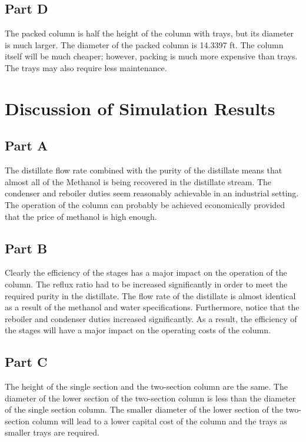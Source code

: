 \documentclass[12pt]{article}
\begin{document}
\subsection{Part D}
The packed column is half the height of the column with trays, but its diameter is much larger. The diameter of the packed column is 14.3397 ft. The column itself will be much cheaper; however, packing is much more expensive than trays. The trays may also require less maintenance.

\section{Discussion of Simulation Results}

\subsection{Part A}
The distillate flow rate combined with the purity of the distillate means that almost all of the Methanol is being recovered in the distillate stream. The condenser and reboiler duties seem reasonably achievable in an industrial setting. The operation of the column can probably be achieved economically provided that the price of methanol is high enough.

\subsection{Part B}
Clearly the efficiency of the stages has a major impact on the operation of the column. The reflux ratio had to be increased significantly in order to meet the required purity in the distillate. The flow rate of the distillate is almost identical as a result of the methanol and water specifications. Furthermore, notice that the reboiler and condenser duties increased significantly. As a result, the efficiency of the stages will have a major impact on the operating costs of the column.

\subsection{Part C}
The height of the single section and the two-section column are the same. The diameter of the lower section of the two-section column is less than the diameter of the single section column. The smaller diameter of the lower section of the two-section column will lead to a lower capital cost of the column and the trays as smaller trays are required.
\end{document}
